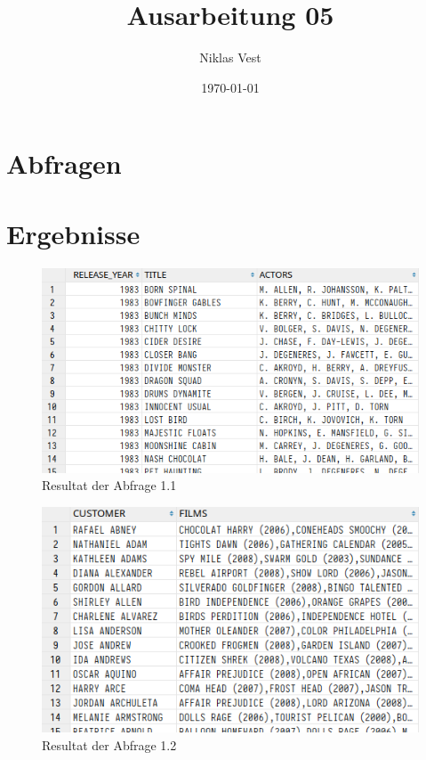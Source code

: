\documentclass[notitlepage]{article}
\title{Ausarbeitung 05}
\author{Niklas Vest}
\date{\today}
\begin{document}
	\maketitle
	\thispagestyle{fancy}
	
	\section*{Abfragen}
	
	\section*{Ergebnisse}
	
	\begin{figure}[H]\centering
		\includegraphics[width=\textwidth]{images/1_1.png}
		\caption{Resultat der Abfrage 1.1}
	\end{figure}

	\begin{figure}[H]\centering
		\includegraphics[width=\textwidth]{images/1_2.png}
		\caption{Resultat der Abfrage 1.2}
	\end{figure}
\end{document}
